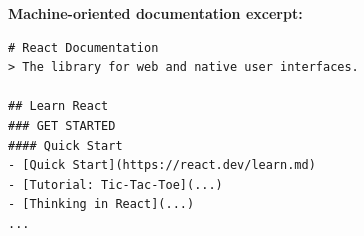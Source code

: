 \documentclass[10pt,conference,a4paper]{IEEEtran}
\makeatletter
\newcounter{subparagraph}[paragraph]
\def\subparagraph{\@startsection{subparagraph}{5}{\parindent}{8pt}{4pt}{\normalfont\normalsize\centering\scshape}}
\makeatother
\begin{document}
\textbf{Machine-oriented documentation excerpt:}
{\tiny
\begin{verbatim}
# React Documentation
> The library for web and native user interfaces.

## Learn React
### GET STARTED
#### Quick Start
- [Quick Start](https://react.dev/learn.md)
- [Tutorial: Tic-Tac-Toe](...)
- [Thinking in React](...)
...
\end{verbatim}
}

\makeatletter
\def\bibsection{\subparagraph*{\refname}}
\makeatother
{}


\end{document}
